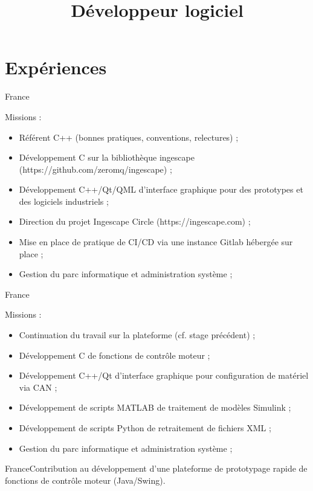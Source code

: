 \documentclass[10pt,a4paper]{moderncv}
\title{Développeur logiciel}
\begin{document}
\maketitle
\section{Expériences}
{France}{Missions :
\begin{itemize}
  \item{Référent C++ (bonnes pratiques, conventions, relectures) ;}
  \item{Développement C sur la bibliothèque ingescape (https://github.com/zeromq/ingescape) ;}
  \item{Développement C++/Qt/QML d'interface graphique pour des prototypes et des logiciels industriels ;}
  \item{Direction du projet Ingescape Circle (https://ingescape.com) ;}
  \item{Mise en place de pratique de CI/CD via une instance Gitlab hébergée sur place ;}
  \item{Gestion du parc informatique et administration système ;}
\end{itemize}}
{France}{Missions :
\begin{itemize}
  \item{Continuation du travail sur la plateforme (cf. stage précédent) ;}
  \item{Développement C de fonctions de contrôle moteur ;}
  \item{Développement C++/Qt d'interface graphique pour configuration de matériel via CAN ;}
  \item{Développement de scripts MATLAB de traitement de modèles Simulink ;}
  \item{Développement de scripts Python de retraitement de fichiers XML ;}
  \item{Gestion du parc informatique et administration système ;}
\end{itemize}}
{France}{Contribution au développement d'une plateforme de prototypage rapide de fonctions
de contrôle moteur (Java/Swing).}
\end{document}
